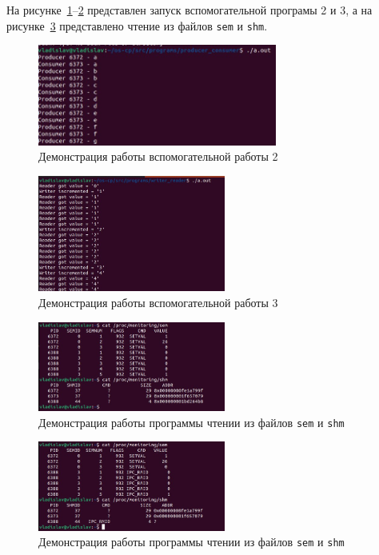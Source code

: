 На рисунке~\ref{img:program-pc}--\ref{img:program-wr} представлен запуск вспомогательной програмы 2 и 3, а на рисунке~\ref{img:example-sem-shm} представлено чтение из файлов \texttt{sem} и \texttt{shm}.

\begin{figure}[h]
	\centering
	\includegraphics[width=0.7\textwidth]{img/program-p-c}
	\caption{Демонстрация работы вспомогательной работы 2}
	\label{img:program-pc}
\end{figure}

\clearpage

\begin{figure}[h]
	\centering
	\includegraphics[width=0.55\textwidth]{img/program-r-w}
	\caption{Демонстрация работы вспомогательной работы 3}
	\label{img:program-wr}
\end{figure}

\begin{figure}[h]
	\centering
	\includegraphics[width=0.55\textwidth]{img/example-sem-shm}
	\caption{Демонстрация работы программы чтении из файлов \texttt{sem} и \texttt{shm}}
	\label{img:example-sem-shm}
\end{figure}

\begin{figure}[h]
	\centering
	\includegraphics[width=0.55\textwidth]{img/example-sem-shm-2}
	\caption{Демонстрация работы программы чтении из файлов \texttt{sem} и \texttt{shm}}
	\label{img:example-sem-shm-2}
\end{figure}